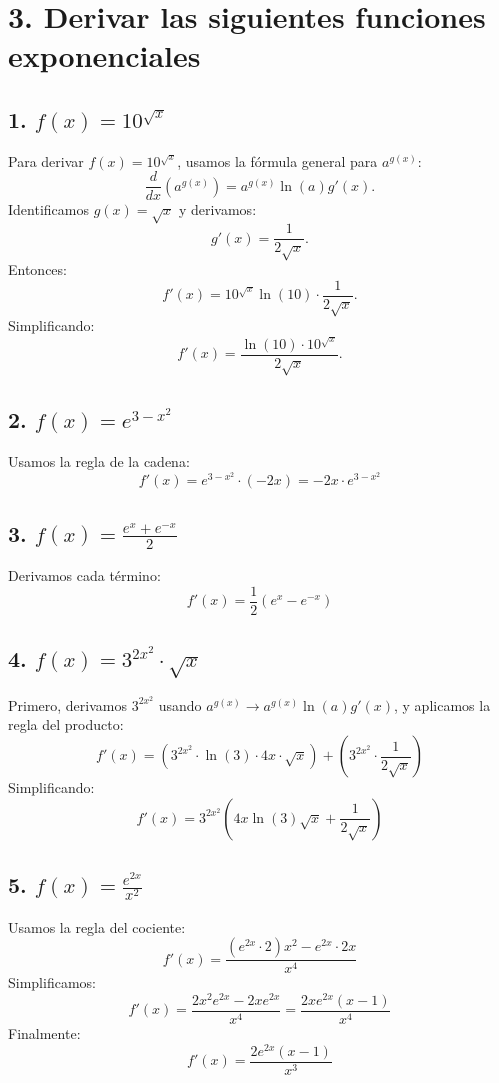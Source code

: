 \documentclass{article}
\begin{document}
\section*{3. Derivar las siguientes funciones exponenciales}

\subsection*{1. \( f(x) = 10^{\sqrt{x}} \)}
Para derivar \( f(x) = 10^{\sqrt{x}} \), usamos la fórmula general para \( a^{g(x)} \):
\[
    \frac{d}{dx} \left( a^{g(x)} \right) = a^{g(x)} \ln(a) g'(x).
\]
Identificamos \( g(x) = \sqrt{x} \) y derivamos:
\[
    g'(x) = \frac{1}{2\sqrt{x}}.
\]
Entonces:
\[
    f'(x) = 10^{\sqrt{x}} \ln(10) \cdot \frac{1}{2\sqrt{x}}.
\]
Simplificando:
\[
    f'(x) = \frac{\ln(10) \cdot 10^{\sqrt{x}}}{2\sqrt{x}}.
\]
\subsection*{2. \( f(x) = e^{3 - x^2} \)}
Usamos la regla de la cadena:
\[
    f'(x) = e^{3 - x^2} \cdot (-2x) = -2x \cdot e^{3 - x^2}
\]

\subsection*{3. \( f(x) = \frac{e^x + e^{-x}}{2} \)}
Derivamos cada término:
\[
    f'(x) = \frac{1}{2} \left( e^x - e^{-x} \right)
\]

\subsection*{4. \( f(x) = 3^{2x^2} \cdot \sqrt{x} \)}
Primero, derivamos \( 3^{2x^2} \) usando \( a^{g(x)} \rightarrow a^{g(x)} \ln(a) g'(x) \), y aplicamos la regla del producto:
\[
    f'(x) = \left(3^{2x^2} \cdot \ln(3) \cdot 4x \cdot \sqrt{x}\right) + \left(3^{2x^2} \cdot \frac{1}{2\sqrt{x}}\right)
\]
Simplificando:
\[
    f'(x) = 3^{2x^2} \left(4x \ln(3) \sqrt{x} + \frac{1}{2\sqrt{x}} \right)
\]

\subsection*{5. \( f(x) = \frac{e^{2x}}{x^2} \)}
Usamos la regla del cociente:
\[
    f'(x) = \frac{\left( e^{2x} \cdot 2 \right) x^2 - e^{2x} \cdot 2x}{x^4}
\]
Simplificamos:
\[
    f'(x) = \frac{2x^2 e^{2x} - 2x e^{2x}}{x^4} = \frac{2xe^{2x}(x - 1)}{x^4}
\]
Finalmente:
\[
    f'(x) = \frac{2e^{2x}(x - 1)}{x^3}
\]
\end{document}
